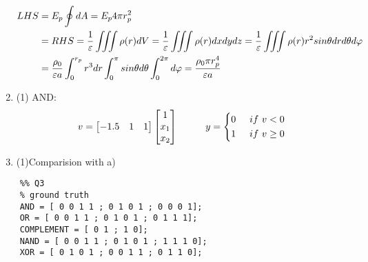 \documentclass[12pt]{article}
\begin{document}
\begin{enumerate}[(1)]
\begin{equation}
	\begin{split}
		LHS &= E_p\oint dA = E_p 4\pi r_p^2\\
		&= RHS = \frac{1}{\varepsilon}\iiint \rho (r)dV = \frac{1}{\varepsilon}\iiint \rho (r)dxdydz = \frac{1}{\varepsilon}\iiint \rho (r) r^2sin\theta drd\theta d\varphi\\
		&=\frac{\rho_0}{\varepsilon a}\int_{0}^{r_p} r^3 dr\int_{0}^{\pi} sin\theta d\theta \int_{0}^{2\pi} d\varphi = \frac{\rho_0 \pi r_p^4}{\varepsilon a} \notag
	\end{split}
\end{equation}
\item
 (1) AND:
$$ v = \begin{bmatrix} -1.5 & 1 & 1\end{bmatrix} \begin{bmatrix} 1 \\ x_1 \\ x_2\end{bmatrix}\hspace{1cm}
y=\left\{
\begin{aligned}
	0\hspace{0.5cm}if\ v < 0 \\
	1\hspace{0.5cm}if\ v \geq 0
\end{aligned}
\right.
$$
\item 
(1)Comparision with a)
\iffalse
\begin{figure}[htbp]
	\centering
	\subfigure[off-line calculation]
	{
		\begin{minipage}[b]{.3\linewidth}
			\centering
			\texttt{[image: and\_off.eps]}
		\end{minipage}
	}
	\subfigure[learning result]
	{
		\begin{minipage}[b]{.3\linewidth}
			\centering
			\texttt{[image: and\_learn.eps]}
		\end{minipage}
	}
	\subfigure[weights trajectories]
	{
		\begin{minipage}[b]{.3\linewidth}
			\centering
			\texttt{[image: and\_w.eps]}
		\end{minipage}
	}
	\caption{AND gate}
\end{figure}
\item 
\begin{figure}[H]
	\centering
	\texttt{[image: and\_100\_sup.eps]}
	\caption{the decision line of $\eta=100$ }
	\label{decison line}
\end{figure}
\fi
	
	
\end{enumerate}
	
\begin{lstlisting}
	%% Q3
	% ground truth
	AND = [ 0 0 1 1 ; 0 1 0 1 ; 0 0 0 1];
	OR = [ 0 0 1 1 ; 0 1 0 1 ; 0 1 1 1];
	COMPLEMENT = [ 0 1 ; 1 0];
	NAND = [ 0 0 1 1 ; 0 1 0 1 ; 1 1 1 0];
	XOR = [ 0 1 0 1 ; 0 0 1 1 ; 0 1 1 0];

\end{lstlisting}
\end{document}
